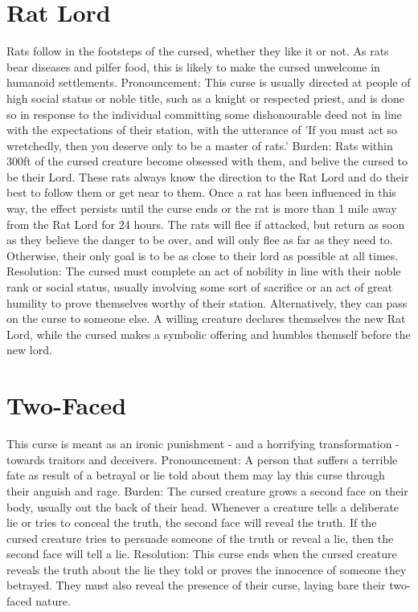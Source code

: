 \documentclass[10pt,a4paper,twoside,twocolumn,openany,bg=print,nodeprecatedcode]{dndbook}
\begin{document}
\section{Rat Lord}
Rats follow in the footsteps of the cursed, whether they like it or not. As rats bear diseases and pilfer food, this is likely to make the cursed unwelcome in humanoid settlements.
Pronouncement: This curse is usually directed at people of high social status or noble title, such as a knight or respected priest, and is done so in response to the individual committing some dishonourable deed not in line with the expectations of their station, with the utterance of 'If you must act so wretchedly, then you deserve only to be a master of rats.'
Burden: Rats within 300ft of the cursed creature become obsessed with them, and belive the cursed to be their Lord. These rats always know the direction to the Rat Lord and do their best to follow them or get near to them. Once a rat has been influenced in this way, the effect persists until the curse ends or the rat is more than 1 mile away from the Rat Lord for 24 hours. The rats will flee if attacked, but return as soon as they believe the danger to be over, and will only flee as far as they need to. Otherwise, their only goal is to be as close to their lord as possible at all times.
Resolution: The cursed must complete an act of nobility in line with their noble rank or social status, usually involving some sort of sacrifice or an act of great humility to prove themselves worthy of their station.
Alternatively, they can pass on the curse to someone else. A willing creature declares themselves the new Rat Lord, while the cursed makes a symbolic offering and humbles themself before the new lord.
\section{Two-Faced}
This curse is meant as an ironic punishment - and a horrifying transformation - towards traitors and deceivers.
Pronouncement: A person that suffers a terrible fate as result of a betrayal or lie told about them may lay this curse through their anguish and rage.
Burden: The cursed creature grows a second face on their body, usually out the back of their head. Whenever a creature tells a deliberate lie or tries to conceal the truth, the second face will reveal the truth. If the cursed creature tries to persuade someone of the truth or reveal a lie, then the second face will tell a lie.
Resolution: This curse ends when the cursed creature reveals the truth about the lie they told or proves the innocence of someone they betrayed. They must also reveal the presence of their curse, laying bare their two-faced nature.
\end{document}
